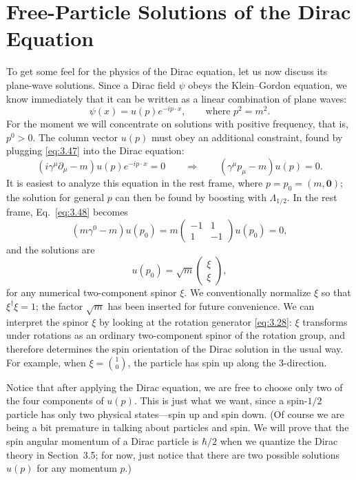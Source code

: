 \section{Free-Particle Solutions of the Dirac Equation}

To get some feel for the physics of the Dirac equation, let us now discuss
its plane-wave solutions.  Since a Dirac field $\psi$ obeys the
Klein--Gordon equation, we know immediately that it can be written as a
linear combination of plane waves:
\begin{equation}
  \psi(x) = u(p)e^{-ip\cdot x},\qquad \text{where } p^2 = m^2 .
  \label{eq:3.47}
\end{equation}
For the moment we will concentrate on solutions with positive frequency, that
is, $p^0>0$.  The column vector $u(p)$ must obey an additional constraint,
found by plugging \eqref{eq:3.47} into the Dirac equation:
\begin{equation}
  (i\gamma^\mu\partial_\mu - m)u(p)e^{-ip\cdot x} = 0
  \qquad\Rightarrow\qquad
  (\gamma^\mu p_\mu - m)u(p) = 0 .
  \label{eq:3.48}
\end{equation}
It is easiest to analyze this equation in the rest frame, where
$p = p_0 = (m, \mathbf{0})$; the solution for general $p$ can then be found by
boosting with $\Lambda_{1/2}$.  In the rest frame, Eq.~\eqref{eq:3.48}
becomes
\begin{equation}
  (m\gamma^0 - m)u(p_0) = m
    \begin{pmatrix}-1&1\\1&-1\end{pmatrix}u(p_0) = 0 ,
\end{equation}
and the solutions are
\begin{equation}
  u(p_0) = \sqrt{m}\begin{pmatrix}\xi\\ \xi\end{pmatrix},
  \label{eq:3.49}
\end{equation}
for any numerical two-component spinor $\xi$.  We conventionally normalize
$\xi$ so that $\xi^\dagger\xi = 1$; the factor $\sqrt{m}$ has been inserted
for future convenience.  We can interpret the spinor $\xi$ by looking at the
rotation generator \eqref{eq:3.28}: $\xi$ transforms under rotations as an
ordinary two-component spinor of the rotation group, and therefore determines
the spin orientation of the Dirac solution in the usual way.  For example,
when $\xi = \binom{1}{0}$, the particle has spin up along the 3-direction.

Notice that after applying the Dirac equation, we are free to choose only two
of the four components of $u(p)$.  This is just what we want, since a spin-$1/2$
particle has only two physical states---spin up and spin down.  (Of course we
are being a bit premature in talking about particles and spin.  We will prove
that the spin angular momentum of a Dirac particle is $\hbar/2$ when we
quantize the Dirac theory in Section~3.5; for now, just notice that there are
two possible solutions $u(p)$ for any momentum $p$.)

